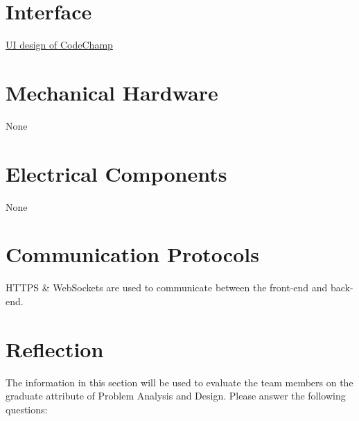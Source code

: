 \documentclass[12pt, titlepage]{article}
\begin{document}
\newpage{}

\appendix

\section{Interface}

\href{https://www.figma.com/file/finLDRJKaEoH8IDQkzlI3X/CodeChamp?node-id=507%
}{UI design of CodeChamp}


\section{Mechanical Hardware}

None

\section{Electrical Components}

None

\section{Communication Protocols}
HTTPS \& WebSockets are used to communicate between the front-end and back-end.

\section{Reflection}

The information in this section will be used to evaluate the team members on the
graduate attribute of Problem Analysis and Design.  Please answer the following questions:
\end{document}
